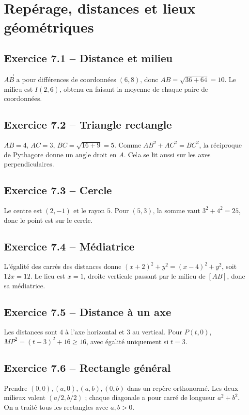 \chapter{Repérage, distances et lieux géométriques}
\section*{Exercice 7.1 -- Distance et milieu}
$\overrightarrow{AB}$ a pour différences de coordonnées $(6,8)$, donc $AB=\sqrt{36+64}=10$. Le milieu est $I(2,6)$, obtenu en faisant la moyenne de chaque paire de coordonnées.

\section*{Exercice 7.2 -- Triangle rectangle}
$AB=4$, $AC=3$, $BC=\sqrt{16+9}=5$. Comme $AB^2+AC^2=BC^2$, la réciproque de Pythagore donne un angle droit en $A$. Cela se lit aussi sur les axes perpendiculaires.

\section*{Exercice 7.3 -- Cercle}
Le centre est $(2,-1)$ et le rayon $5$. Pour $(5,3)$, la somme vaut $3^2+4^2=25$, donc le point est sur le cercle.

\section*{Exercice 7.4 -- Médiatrice}
L'égalité des carrés des distances donne $(x+2)^2+y^2=(x-4)^2+y^2$, soit $12x=12$. Le lieu est $x=1$, droite verticale passant par le milieu de $[AB]$, donc sa médiatrice.

\section*{Exercice 7.5 -- Distance à un axe}
Les distances sont $4$ à l'axe horizontal et $3$ au vertical. Pour $P(t,0)$, $MP^2=(t-3)^2+16\geq16$, avec égalité uniquement si $t=3$.

\section*{Exercice 7.6 -- Rectangle général}
Prendre $(0,0),(a,0),(a,b),(0,b)$ dans un repère orthonormé. Les deux milieux valent $(a/2,b/2)$ ; chaque diagonale a pour carré de longueur $a^2+b^2$. On a traité tous les rectangles avec $a,b>0$.
